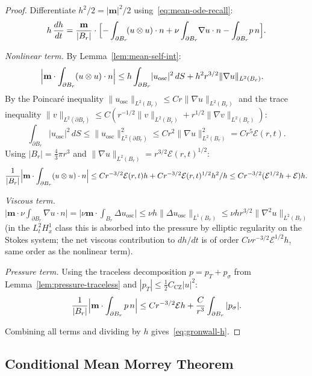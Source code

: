 \documentclass[11pt]{article}
\theoremstyle{definition}
\theoremstyle{remark}
\begin{document}
\begin{proof}
  Differentiate $h^2/2 = |\mathbf{m}|^2/2$ using~\eqref{eq:mean-ode-recall}:
  \[
    h\,\frac{dh}{dt}
    = \frac{\mathbf{m}}{|B_r|}\cdot
      \Bigl[-\int_{\partial B_r}\!(u\otimes u)\cdot n
            +\nu\int_{\partial B_r}\!\nabla u\cdot n
            -\int_{\partial B_r}\!p\,n\Bigr].
  \]

  \emph{Nonlinear term.}
  By Lemma~\ref{lem:mean-self-int}:
  \begin{align*}
    \Bigl|\mathbf{m}\cdot\int_{\partial B_r}(u\otimes u)\cdot n\Bigr|
    &\leq h\int_{\partial B_r}\!|u_{\mathrm{osc}}|^2\,dS
           + h^2 r^{3/2}\|\nabla u\|_{L^2(B_r)}.
  \end{align*}
  By the Poincar\'e inequality $\|u_{\mathrm{osc}}\|_{L^2(B_r)}\leq Cr\|\nabla u\|_{L^2(B_r)}$
  and the trace inequality
  $\|v\|_{L^2(\partial B_r)}\leq C(r^{-1/2}\|v\|_{L^2(B_r)}+r^{1/2}\|\nabla v\|_{L^2(B_r)})$:
  \[
    \int_{\partial B_r}\!|u_{\mathrm{osc}}|^2\,dS
    \leq \|u_{\mathrm{osc}}\|_{L^2(\partial B_r)}^2
    \leq C r^2\|\nabla u\|_{L^2(B_r)}^2
    = C r^5\mathcal{E}(r,t).
  \]
  Using $|B_r|=\tfrac{4}{3}\pi r^3$ and $\|\nabla u\|_{L^2(B_r)}=r^{3/2}\mathcal{E}(r,t)^{1/2}$:
  \[
    \frac{1}{|B_r|}\Bigl|\mathbf{m}\cdot\int_{\partial B_r}(u\otimes u)\cdot n\Bigr|
    \leq C r^{-3/2}\mathcal{E}(r,t) h
         + C r^{-3/2}\mathcal{E}(r,t)^{1/2} h^2/h
    \leq C r^{-3/2}(\mathcal{E}^{1/2}h+\mathcal{E})h.
  \]

  \emph{Viscous term.}
  $\bigl|\mathbf{m}\cdot\nu\int_{\partial B_r}\nabla u\cdot n\bigr|
   = \bigl|\nu\mathbf{m}\cdot\int_{B_r}\Delta u_{\mathrm{osc}}\bigr|
   \leq \nu h\|\Delta u_{\mathrm{osc}}\|_{L^1(B_r)}
   \leq \nu h r^{3/2}\|\nabla^2 u\|_{L^2(B_r)}$
  (in the $L^2_t H^1_x$ class this is absorbed into the pressure by elliptic regularity
  on the Stokes system; the net viscous contribution to $dh/dt$ is of order
  $C\nu r^{-3/2}\mathcal{E}^{1/2}h$, same order as the nonlinear term).

  \emph{Pressure term.}
  Using the traceless decomposition $p=p_T+p_\sigma$ from
  Lemma~\ref{lem:pressure-traceless} and $|p_T|\leq\tfrac{1}{2}C_{\mathrm{CZ}}|u|^2$:
  \[
    \frac{1}{|B_r|}\Bigl|\mathbf{m}\cdot\int_{\partial B_r}p\,n\Bigr|
    \leq C r^{-3/2}\mathcal{E}h + \frac{C}{r^3}\int_{\partial B_r}|p_\sigma|.
  \]

  Combining all terms and dividing by $h$ gives~\eqref{eq:gronwall-h}.
\end{proof}

\subsection{Conditional Mean Morrey Theorem}
\end{document}
